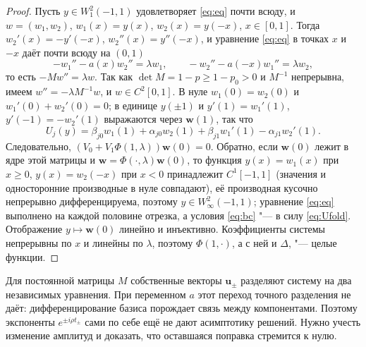 \documentclass[12pt,a4paper]{article}
\numberwithin{equation}{section}
\theoremstyle{definition}
\begin{document}
\begin{proof}
Пусть $y\in W^2_1(-1,1)$ удовлетворяет \eqref{eq:eq} почти всюду, и $w=(w_1,w_2)$,
$w_1(x)=y(x)$, $w_2(x)=y(-x)$, $x\in[0,1]$. Тогда $w_2'(x)=-y'(-x)$, $w_2''(x)=y''(-x)$, и
уравнение \eqref{eq:eq} в точках $x$ и $-x$ даёт почти всюду на $(0,1)$
\[
 -w_1''-a(x)w_2''=\lambda w_1,\qquad -w_2''-a(-x)w_1''=\lambda w_2,
\]
то есть $-Mw''=\lambda w$. Так как $\det M=1-p\ge1-p_0>0$ и $M^{-1}$ непрерывна, имеем
$w''=-\lambda M^{-1}w$, и $w\in C^2[0,1]$. В нуле $w_1(0)=w_2(0)$ и $w_1'(0)+w_2'(0)=0$; в
единице $y(\pm1)$ и $y'(1)=w_1'(1)$, $y'(-1)=-w_2'(1)$ выражаются через $\mathbf w(1)$, так что
\begin{equation}\label{eq:Ufold}
 U_j(y)=\beta_{j0}w_1(1)+\alpha_{j0}w_2(1)+\beta_{j1}w_1'(1)-\alpha_{j1}w_2'(1).
\end{equation}
Следовательно, $(V_0+V_1\Phi(1,\lambda))\mathbf w(0)=0$. Обратно, если $\mathbf w(0)$ лежит в ядре
этой матрицы и $\mathbf w=\Phi(\cdot,\lambda)\mathbf w(0)$, то функция $y(x)=w_1(x)$ при $x\ge0$,
$y(x)=w_2(-x)$ при $x<0$ принадлежит $C^1[-1,1]$ (значения и односторонние производные в нуле
совпадают), её производная кусочно непрерывно дифференцируема, поэтому $y\in W^2_\infty(-1,1)$;
уравнение \eqref{eq:eq} выполнено на каждой половине отрезка, а условия \eqref{eq:bc} "--- в силу
\eqref{eq:Ufold}. Отображение $y\mapsto\mathbf w(0)$ линейно и инъективно. Коэффициенты системы
непрерывны по $x$ и линейны по $\lambda$, поэтому $\Phi(1,\cdot)$, а с ней и $\Delta$, "--- целые
функции.
\end{proof}

Для постоянной матрицы $M$ собственные векторы $\mathbf u_\pm$ разделяют систему
на два независимых уравнения. При переменном $a$ этот переход точного разделения
не даёт: дифференцирование базиса порождает связь между компонентами. Поэтому
экспоненты $e^{\pm i\rho t_\pm}$ сами по себе ещё не дают асимптотику решений.
Нужно учесть изменение амплитуд и доказать, что оставшаяся поправка стремится к нулю.
\end{document}
